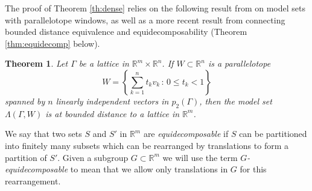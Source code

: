 \documentclass[12pt,a4paper,oneside]{amsart}
\theoremstyle{plain}
\newtheorem{theorem}{Theorem}
\theoremstyle{definition}
\newcounter{rem}
\begin{document}
The proof of Theorem \ref{th:dense} relies on the following result from \cite{DO1991} on model sets with parallelotope windows, as well as a more recent result from \cite{EGKL2025} connecting bounded distance equivalence and equidecomposability (Theorem \ref{thm:equidecomp} below).
\begin{theorem}{\cite[Theorem 3.1]{DO1991}}\label{thm:do}
Let $\Gamma$ be a lattice in $\mathbb{R}^m \times \mathbb{R}^n$. If $W \subset \mathbb{R}^n$ is a parallelotope
\[W= \left\{ \sum_{k=1}^n t_k v_k \, : \, 0 \leq t_k < 1 \right\}\]
spanned by $n$ linearly independent vectors in $p_2(\Gamma)$, then the model set $\Lambda(\Gamma, W)$ is at bounded distance to a lattice in $\mathbb{R}^m$.
\end{theorem}
We say that two sets $S$ and $S'$ in $\mathbb{R}^m$ are \emph{equidecomposable} if $S$ can be partitioned into finitely many subsets which can be rearranged by translations to form a partition of $S'$. Given a subgroup $G \subset \mathbb{R}^m$ we will use the term \emph{$G$-equidecomposable} to mean that we allow only translations in $G$ for this rearrangement.
\end{document}
